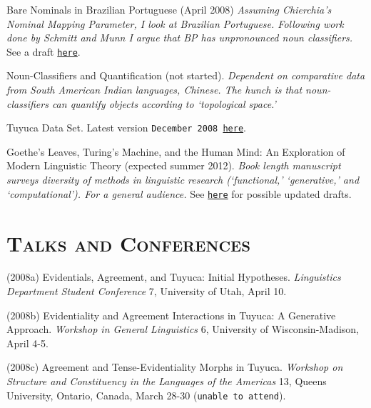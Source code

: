 \documentclass{resume}
\begin{document}
\begin{resume}

Bare Nominals in Brazilian Portuguese (April 2008) {\sl Assuming Chierchia's Nominal Mapping Parameter, I look at Brazilian Portuguese. Following work done by Schmitt and Munn I argue that BP has unpronounced noun classifiers.} See a draft \href{http://sites.google.com/site/bowleslinguistics/Home/research}{\texttt{here}}.

Noun-Classifiers and Quantification (not started). \textsl{Dependent on comparative data from South American Indian languages, Chinese. The hunch is that noun-classifiers can quantify objects according to `topological space.'}

Tuyuca Data Set. Latest version \texttt{December 2008 \href{http://sites.google.com/site/bowleslinguistics/Home/research}{here}}.

Goethe's Leaves, Turing's Machine, and the Human Mind: An Exploration of Modern Linguistic Theory (expected summer 2012). \textsl{Book length manuscript surveys diversity of methods in linguistic research (`functional,' `generative,' and `computational'). For a general audience.} See \href{http://sites.google.com/site/bowleslinguistics/Home/research/misc-1}{\texttt{here}} for possible updated drafts.


\section{\textsc{Talks and Conferences}}
(2008a) Evidentials, Agreement, and Tuyuca: Initial Hypotheses. \emph{Linguistics Department
Student Conference} 7, University of Utah, April 10.

(2008b) Evidentiality and Agreement Interactions in Tuyuca: A Generative Approach.
\emph{Workshop in General Linguistics} 6, University of Wisconsin-Madison, April 4-5.

(2008c) Agreement and Tense-Evidentiality Morphs in Tuyuca. \emph{Workshop on Structure
and Constituency in the Languages of the Americas} 13, Queens University,
Ontario, Canada, March 28-30 (\texttt{unable to attend}).


\end{resume}
\end{document}
